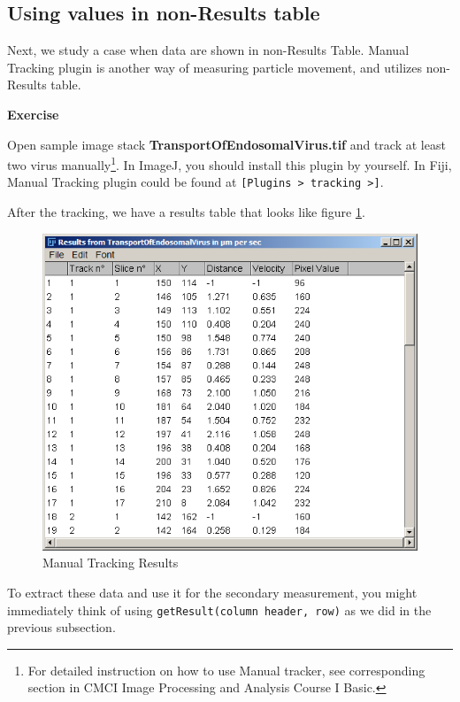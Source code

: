 \documentclass[11pt,a4paper,oneside]{report}
\newenvironment{indentexercise}[1]%
{{\setlength{\leftmargin}{2em}}%
\textbf{Exercise \thesubsection-#1}%
\begin{list}{}%
	\item%
}
{\end{list}}
\newcommand{\ijmenu}[1]{\texttt{\small#1}}
\newcommand{\ilcom}[1]{\texttt{\small#1}}
\begin{document}
\subsection{Using values in non-Results table}
Next, we study a case when data are shown in non-Results Table. 
Manual Tracking plugin is another way of measuring particle movement, and utilizes non-Results table. 

\begin{indentexercise}{1}
Open sample image stack \textbf{TransportOfEndosomalVirus.tif} 
and track at least two virus manually\footnote{ For detailed instruction on how to use Manual tracker, 
see corresponding section in CMCI Image Processing and Analysis Course I Basic.}. 
In ImageJ, you should install this plugin by yourself. 
In Fiji, Manual Tracking plugin could be found at \ijmenu{[Plugins > tracking >]}.
\end{indentexercise}

After the tracking, we have a results table that looks like figure \ref{fig:manualtrackingresults}.
\begin{figure}[htbp]
\begin{center}
\includegraphics[scale=0.6]{fig/fig253_ManualTrackerResultsWindow.png}
\caption{Manual Tracking Results}
\label{fig:manualtrackingresults}
\end{center}
\end{figure}

To extract these data and use it for the secondary measurement, 
you might immediately think of using \ilcom{getResult(column header, row)} 
as we did in the previous subsection.
\end{document}
